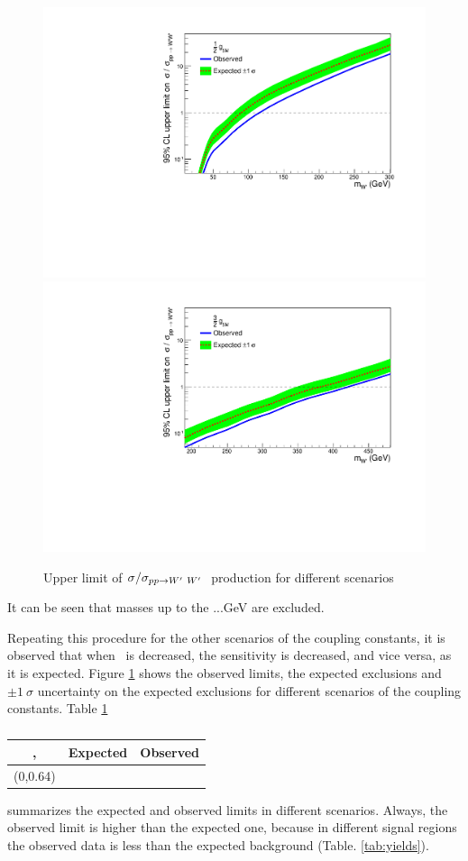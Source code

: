 \begin{figure}[!htb]
  \hspace{3mm}
  \includegraphics*[width=.45\textwidth]{figs/mixHalvedb.pdf}
  \vspace{3mm}
  \includegraphics*[width=.45\textwidth]{figs/mix3Over2b.pdf}
  \caption{Upper limit of $\sigma/\sigma_{pp \rightarrow W^\prime~ W^\prime~}$ production for different scenarios}
  \label{fig:brazilianFlags}
\end{figure}
It can be seen that \wprime masses up to the ...GeV are excluded.  

Repeating this procedure for the other scenarios of the coupling constants, it is observed that when \gL ~is decreased, the sensitivity is decreased, and vice versa, as it is expected. Figure \ref{fig:brazilianFlags} shows the observed limits, the expected exclusions and $\pm 1 ~\sigma$ uncertainty on the expected exclusions for different scenarios of the coupling constants. Table \ref{tab:ObservedLimits}
\begin{table}[htb]
	\centering
	\caption{ \label{tab:ObservedLimits} }
	\begin{tabular}{|c|c|c|}
	\hline
	\gR, \gL           & Expected & Observed \\\hline
	(0,0.64)           &      &      \\\hline
	\end{tabular}
\end{table}
summarizes the expected and observed limits in different scenarios. Always, the observed limit is higher than the expected one, because in different signal regions the observed data is less than the expected background (Table. \ref{tab:yields}).


